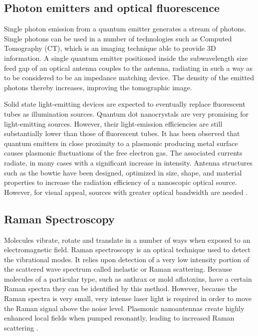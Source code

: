 \documentclass[11pt]{article}
\begin{document}
\subsection{Photon emitters and optical fluorescence}
%
Single photon emission from a quantum emitter generates a stream of photons. Single photons can be used in a number of technologies such as Computed Tomography (CT), which is an imaging technique able to provide 3D information. A single quantum emitter positioned inside the subwavelength size feed gap of an optical antenna couples to the antenna, radiating in such a way as to be considered to be an impedance matching device. The density of the emitted photons thereby increases, improving the tomographic image.

Solid state light-emitting devices are expected to eventually replace fluorescent tubes as illumination sources. Quantum dot nanocrystals are very promising for light-emitting sources. However, their light-emission efficiencies are still substantially lower than those of fluorescent tubes. It has been observed that quantum emitters in close proximity to a plasmonic producing metal surface causes plasmonic fluctuations of the free electron gas. The associated currents radiate, in many cases with a significant increase in intensity. Antenna structures such as the bowtie have been designed, optimized in size, shape, and material properties to increase the radiation efficiency of a nanoscopic optical source. However, for visual appeal, sources with greater optical bandwidth are needed \cite{farahani,Curto2010}.
\subsection{Raman Spectroscopy}
%
Molecules vibrate, rotate and translate in a number of ways when exposed to an electromagnetic field. Raman spectroscopy is an optical technique used to detect the vibrational modes. It relies upon detection of a very low intensity portion of the scattered wave spectrum called inelastic or Raman scattering. Because molecules of a particular type, such as anthrax or mold aflatoxins, have a certain Raman spectra they can be identified by this method. However, because the Raman spectra is very small, very intense laser light is required in order to move the Raman signal above the noise level. Plasmonic nanoantennas create highly enhanced local fields when pumped resonantly, leading to increased Raman scattering \cite{Felidj2003}.
\end{document}

